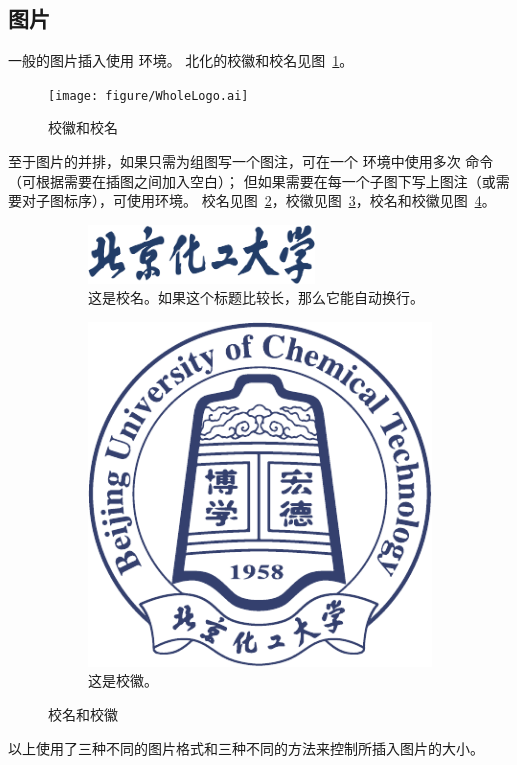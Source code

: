 \subsection{图片}\label{subsec:fig}
一般的图片插入使用  环境。
北化的校徽和校名见图~\ref{fig:WholeLogo}。

\begin{figure}[H]
	\centering
	\texttt{[image: figure/WholeLogo.ai]}
	\caption{校徽和校名}\label{fig:WholeLogo}
\end{figure}

至于图片的并排，如果只需为组图写一个图注，可在一个  环境中使用多次  命令（可根据需要在插图之间加入空白）；
但如果需要在每一个子图下写上图注（或需要对子图标序），可使用环境。
校名见图~\ref{subfig:znname}，校徽见图~\ref{subfig:logo}，校名和校徽见图~\ref{fig:wholelogo}。
\begin{figure}[H]
	\centering%
	\begin{subfigure}[t]{6cm}
		\includegraphics[width=6cm]{figure/ZNName.png}
		\caption{这是校名。如果这个标题比较长，那么它能自动换行。}\label{subfig:znname}
	\end{subfigure}
	\hspace{1cm}
	\begin{subfigure}[t]{2.5cm}
		\includegraphics[scale=0.4]{figure/Logo.pdf}
		\caption{这是校徽。}\label{subfig:logo}
	\end{subfigure}
	\caption{校名和校徽}\label{fig:wholelogo}
\end{figure}
以上使用了三种不同的图片格式和三种不同的方法来控制所插入图片的大小。

